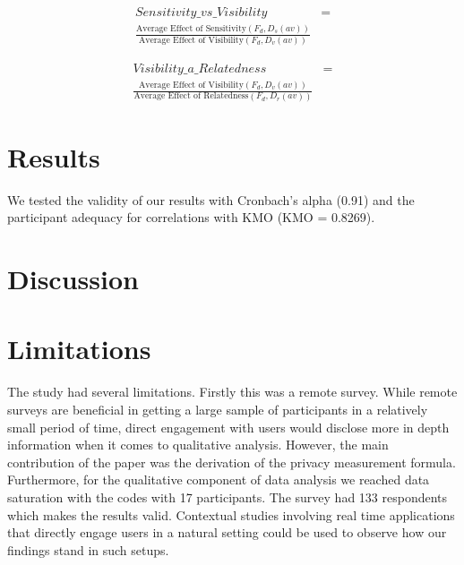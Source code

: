\documentclass[conference]{IEEEtran}
\begin{document}
 \begin{equation} \label{eq1}
\begin{split}
Sensitivity\_vs\_Visibility & = \\ \frac{\text{Average Effect of Sensitivity}(F_{d},D_{s}(av))}{\text{Average Effect of Visibility}(F_{d},D_{v}(av)) } 
\end{split}
\end{equation}

 \begin{equation} \label{eq1}
\begin{split}
Visibility\_a\_Relatedness & = \\ \frac{\text{Average Effect of Visibility}(F_{d},D_{v}(av)) }{\text{Average Effect of Relatedness}(F_{d},D_{r}(av))} 
\end{split}
\end{equation}




\section {Results}

We tested the validity of our results with Cronbach's alpha (0.91) and the participant adequacy for correlations with KMO (KMO =  0.8269). 

\section{Discussion}

\section {Limitations}

The study had several limitations. Firstly this was a remote survey. While remote surveys are beneficial in getting a large sample of participants in a relatively small period of time, direct engagement with users would disclose more in depth information when it comes to qualitative analysis. However, the main contribution of the paper was the derivation of the privacy measurement formula. Furthermore, for the qualitative component of data analysis we reached data saturation with the codes with 17 participants. The survey had 133 respondents which makes the results valid. Contextual studies involving real time applications that directly engage users in a natural setting could be used to observe how our findings stand in such setups.
\end{document}
